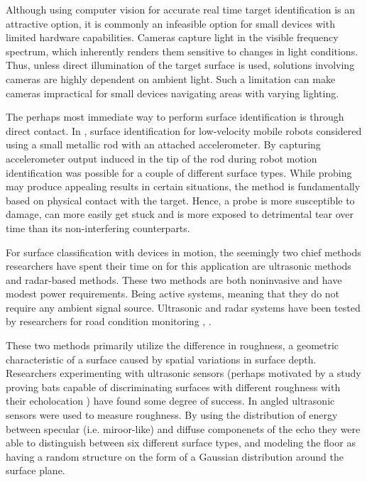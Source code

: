 Although using computer vision for accurate real time target identification is an attractive option, it is commonly an infeasible option for small devices with limited hardware capabilities. Cameras capture light in the visible frequency spectrum, which inherently renders them sensitive to changes in light conditions. Thus, unless direct illumination of the target surface is used, solutions involving cameras are highly dependent on ambient light. Such a limitation can make cameras impractical for small devices navigating areas with varying lighting. 

The perhaps most immediate way to perform surface identification is through direct contact. In \citep{giguere_dudek_2011}, surface identification for low-velocity mobile robots considered using a small metallic rod with an attached accelerometer. By capturing accelerometer output induced in the tip of the rod during robot motion identification was possible for a couple of different surface types. While probing may produce appealing results in certain situations, the method is fundamentally based on physical contact with the target. Hence, a probe is more susceptible to damage, can more easily get stuck and is more exposed to detrimental tear over time than its non-interfering counterparts. 

For surface classification with devices in motion, the seemingly two chief methods researchers have spent their time on for this application are ultrasonic methods and radar-based methods. These two methods are both noninvasive and have modest power requirements. Being active systems, meaning that they do not require any ambient signal source. Ultrasonic and radar systems have been tested by researchers for road condition monitoring \citep{bystrov_2016}, \citep{mckerrow_kristiansen_2006}.

These two methods primarily utilize the difference in roughness, a geometric characteristic of a surface caused by spatial variations in surface depth. Researchers experimenting with ultrasonic sensors (perhaps motivated by a study proving bats capable of discriminating surfaces with different roughness with their echolocation \citep{schmidt_1988}) have found some degree of success. In \citep{politis_probert_1999} angled ultrasonic sensors were used to measure roughness. By using the distribution of energy between specular (i.e. miroor-like) and diffuse componenets of the echo they were able to distinguish between six different surface types, and modeling the floor as having a random structure on the form of a Gaussian distribution around the surface plane.



